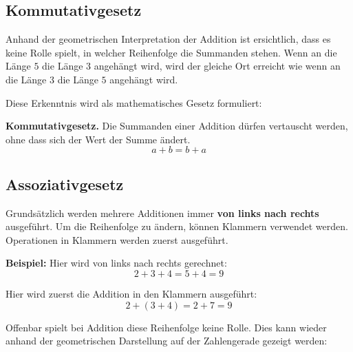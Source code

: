 \subsection{Kommutativgesetz}

Anhand der geometrischen Interpretation der Addition ist ersichtlich, dass es keine Rolle spielt, in welcher Reihenfolge die Summanden stehen. Wenn an die Länge $5$ die Länge $3$ angehängt wird, wird der gleiche Ort erreicht wie wenn an die Länge $3$ die Länge $5$ angehängt wird.
\begin{center}
\end{center}

Diese Erkenntnis wird als mathematisches Gesetz formuliert:

\begin{theorem}
\textbf{Kommutativgesetz.} Die Summanden einer Addition dürfen vertauscht werden, ohne dass sich der Wert der Summe ändert.
\[
  a + b = b + a
\]
\end{theorem}

\subsection{Assoziativgesetz}

Grundsätzlich werden mehrere Additionen immer \textbf{von links nach rechts} ausgeführt. Um die Reihenfolge zu ändern, können Klammern verwendet werden. Operationen in Klammern werden zuerst ausgeführt.

\begin{example}
  \textbf{Beispiel:} Hier wird von links nach rechts gerechnet:
  \[
    2 + 3 + 4 = 5 + 4 = 9
  \]

  Hier wird zuerst die Addition in den Klammern ausgeführt:
  \[
    2 + (3 + 4) = 2 + 7 = 9
  \]
\end{example}

Offenbar spielt bei Addition diese Reihenfolge keine Rolle. Dies kann wieder anhand der geometrischen Darstellung auf der Zahlengerade gezeigt werden:
\begin{center}
\end{center}

